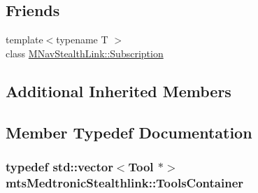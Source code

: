 \subsection*{Friends}
\begin{DoxyCompactItemize}
\item 
{\footnotesize template$<$typename T $>$ }\\class \hyperlink{classmts_medtronic_stealthlink_a4366be00dfae3e97b5db855f73f8e36b}{M\+Nav\+Stealth\+Link\+::\+Subscription}
\end{DoxyCompactItemize}
\subsection*{Additional Inherited Members}


\subsection{Member Typedef Documentation}
\hypertarget{classmts_medtronic_stealthlink_ab6218cf1cbe807b4cc2cc262528e7ae9}{}
\subsubsection[{Tools\+Container}]{\setlength{\rightskip}{0pt plus 5cm}typedef std\+::vector$<${\bf Tool} $\ast$$>$ {\bf mts\+Medtronic\+Stealthlink\+::\+Tools\+Container}\hspace{0.3cm}{\ttfamily [protected]}}\label{classmts_medtronic_stealthlink_ab6218cf1cbe807b4cc2cc262528e7ae9}


